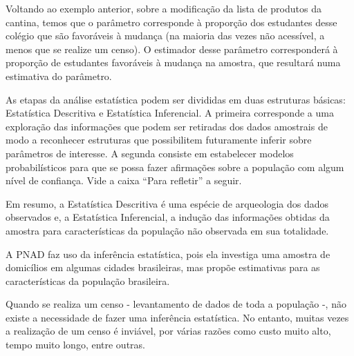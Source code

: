 Voltando ao exemplo anterior, sobre a modificação da lista de produtos da cantina, temos que o parâmetro corresponde à proporção dos estudantes desse colégio que são favoráveis à mudança (na maioria das vezes não acessível, a menos que se realize um censo). O estimador desse parâmetro corresponderá à proporção de estudantes favoráveis à mudança na amostra, que resultará numa estimativa do parâmetro.

As etapas da análise estatística podem ser divididas em duas estruturas básicas: Estatística Descritiva e Estatística Inferencial. A primeira corresponde a uma exploração das informações que podem ser retiradas dos dados amostrais de modo a reconhecer estruturas que possibilitem futuramente inferir sobre parâmetros de interesse. A segunda consiste em estabelecer modelos probabilísticos para que se possa fazer afirmações sobre a população com algum nível de confiança. Vide a caixa ``Para refletir'' a seguir.

Em resumo, a Estatística Descritiva é uma espécie de arqueologia dos dados observados e, a Estatística Inferencial, a indução das informações obtidas da amostra para características da população não observada em sua totalidade.

A PNAD faz uso da inferência estatística, pois ela investiga uma amostra de domicílios em algumas cidades brasileiras, mas propõe estimativas para as características da população brasileira.

Quando se realiza um censo - levantamento de dados de toda a população -, não existe a necessidade de fazer uma inferência estatística. No entanto, muitas vezes a realização de um censo é inviável, por várias razões como custo muito alto, tempo muito longo, entre outras.

